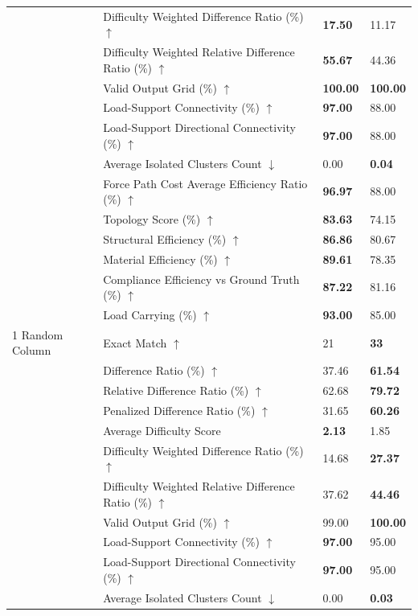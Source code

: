 \begin{table}[!h]
{\begin{tabular}{llll}
 & Difficulty Weighted Difference Ratio (\%) $\uparrow$ & \textbf{17.50} & 11.17 \\
 & Difficulty Weighted Relative Difference Ratio (\%) $\uparrow$ & \textbf{55.67} & 44.36 \\
 & Valid Output Grid (\%) $\uparrow$ & \textbf{100.00} & \textbf{100.00} \\
 & Load-Support Connectivity (\%) $\uparrow$ & \textbf{97.00} & 88.00 \\
 & Load-Support Directional Connectivity (\%) $\uparrow$ & \textbf{97.00} & 88.00 \\
 & Average Isolated Clusters Count $\downarrow$ & 0.00 & \textbf{0.04} \\
 & Force Path Cost Average Efficiency Ratio (\%) $\uparrow$ & \textbf{96.97} & 88.00 \\
 & Topology Score (\%) $\uparrow$ & \textbf{83.63} & 74.15 \\
 & Structural Efficiency (\%) $\uparrow$ & \textbf{86.86} & 80.67 \\
 & Material Efficiency (\%) $\uparrow$ & \textbf{89.61} & 78.35 \\
 & Compliance Efficiency vs Ground Truth (\%) $\uparrow$ & \textbf{87.22} & 81.16 \\
 & Load Carrying (\%) $\uparrow$ & \textbf{93.00} & 85.00 \\
1 Random Column & Exact Match $\uparrow$ & 21 & \textbf{33} \\
 & Difference Ratio (\%) $\uparrow$ & 37.46 & \textbf{61.54} \\
 & Relative Difference Ratio (\%) $\uparrow$ & 62.68 & \textbf{79.72} \\
 & Penalized Difference Ratio (\%) $\uparrow$ & 31.65 & \textbf{60.26} \\
 & Average Difficulty Score & \textbf{2.13} & 1.85 \\
 & Difficulty Weighted Difference Ratio (\%) $\uparrow$ & 14.68 & \textbf{27.37} \\
 & Difficulty Weighted Relative Difference Ratio (\%) $\uparrow$ & 37.62 & \textbf{44.46} \\
 & Valid Output Grid (\%) $\uparrow$ & 99.00 & \textbf{100.00} \\
 & Load-Support Connectivity (\%) $\uparrow$ & \textbf{97.00} & 95.00 \\
 & Load-Support Directional Connectivity (\%) $\uparrow$ & \textbf{97.00} & 95.00 \\
 & Average Isolated Clusters Count $\downarrow$ & 0.00 & \textbf{0.03} \\

\end{tabular}}
\end{table}
